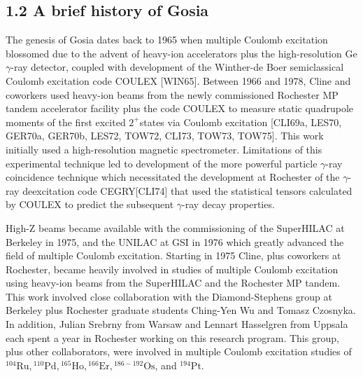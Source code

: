 \documentclass[10pt]{article}
\begin{document}
\subsection*{1.2 A brief history of Gosia}
The genesis of Gosia dates back to 1965 when multiple Coulomb excitation blossomed due to the advent of heavy-ion accelerators plus the high-resolution Ge $\gamma$-ray detector, coupled with development of the Winther-de Boer semiclassical Coulomb excitation code COULEX [WIN65]. Between 1966 and 1978, Cline and coworkers used heavy-ion beams from the newly commissioned Rochester MP tandem accelerator facility plus the code COULEX to measure static quadrupole moments of the first excited $2^{+}$states via Coulomb excitation [CLI69a, LES70, GER70a, GER70b, LES72, TOW72, CLI73, TOW73, TOW75]. This work initially used a high-resolution magnetic spectrometer. Limitations of this experimental technique led to development of the more powerful particle $\gamma$-ray coincidence technique which necessitated the development at Rochester of the $\gamma$-ray deexcitation code CEGRY[CLI74] that used the statistical tensors calculated by COULEX to predict the subsequent $\gamma$-ray decay properties.

High-Z beams became available with the commissioning of the SuperHILAC at Berkeley in 1975, and the UNILAC at GSI in 1976 which greatly advanced the field of multiple Coulomb excitation. Starting in 1975 Cline, plus coworkers at Rochester, became heavily involved in studies of multiple Coulomb excitation using heavy-ion beams from the SuperHILAC and the Rochester MP tandem. This work involved close collaboration with the Diamond-Stephens group at Berkeley plus Rochester graduate students Ching-Yen Wu and Tomasz Czosnyka. In addition, Julian Srebrny from Warsaw and Lennart Hasselgren from Uppsala each spent a year in Rochester working on this research program. This group, plus other collaborators, were involved in multiple Coulomb excitation studies of ${ }^{104} \mathrm{Ru},{ }^{110} \mathrm{Pd},{ }^{165} \mathrm{Ho},{ }^{166} \mathrm{Er},{ }^{186-192} \mathrm{Os}$, and ${ }^{194} \mathrm{Pt}$.
\end{document}
